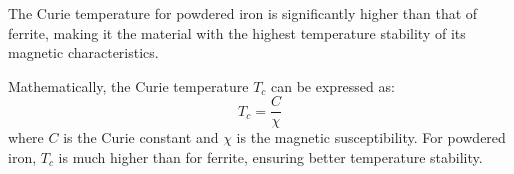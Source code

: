 The Curie temperature for powdered iron is significantly higher than that of ferrite, making it the material with the highest temperature stability of its magnetic characteristics. 

Mathematically, the Curie temperature \( T_c \) can be expressed as:
\[ T_c = \frac{C}{\chi} \]
where \( C \) is the Curie constant and \( \chi \) is the magnetic susceptibility. For powdered iron, \( T_c \) is much higher than for ferrite, ensuring better temperature stability.

